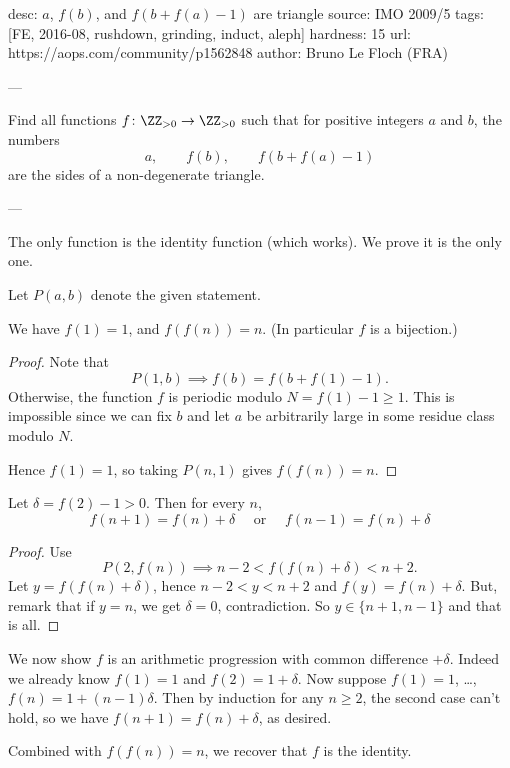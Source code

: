 desc: $a$, $f(b)$, and $f(b+f(a)-1)$ are triangle
source: IMO 2009/5
tags: [FE, 2016-08, rushdown, grinding, induct, aleph]
hardness: 15
url: https://aops.com/community/p1562848
author: Bruno Le Floch (FRA)

---

Find all functions $f \colon \ZZ_{>0} \to \ZZ_{>0}$
such that for positive integers $a$ and $b$, the numbers
\[ a, \qquad f(b), \qquad f(b+f(a)-1) \]
are the sides of a non-degenerate triangle.

---

The only function is the identity function (which works).
We prove it is the only one.

Let $P(a,b)$ denote the given statement.

\begin{claim*}
  We have $f(1) = 1$, and $f(f(n)) = n$.
  (In particular $f$ is a bijection.)
\end{claim*}
\begin{proof}
  Note that \[ P(1,b) \implies f(b) = f(b+f(1)-1). \]
  Otherwise, the function $f$ is periodic modulo $N = f(1)-1 \ge 1$.
  This is impossible since we can fix $b$ and let $a$ be arbitrarily
  large in some residue class modulo $N$.

  Hence $f(1)=1$, so taking $P(n,1)$ gives $f(f(n)) = n$.
\end{proof}

\begin{claim*}
  Let $\delta = f(2)-1 > 0$.
  Then for every $n$,
  \[ f(n+1) = f(n) + \delta
    \quad\text{ or }\quad f(n-1) = f(n) + \delta \]
\end{claim*}
\begin{proof}
  Use
  \[ P(2, f(n)) \implies n-2 < f( f(n) + \delta ) < n+2. \]
  Let $y = f(f(n)+\delta)$, hence $n-2 < y < n+2$
  and $f(y) = f(n)+\delta$.
  But, remark that if $y = n$, we get $\delta = 0$, contradiction.
  So $y \in \{n+1, n-1\}$ and that is all.
\end{proof}

We now show $f$ is an arithmetic progression
with common difference $+\delta$.
Indeed we already know $f(1) = 1$ and $f(2) = 1+\delta$.
Now suppose $f(1)=1$, \dots, $f(n) = 1 + (n-1)\delta$.
Then by induction for any $n \ge 2$,
the second case can't hold,
so we have $f(n+1) = f(n)+\delta$, as desired.

Combined with $f(f(n)) = n$, we recover that $f$ is the identity.
